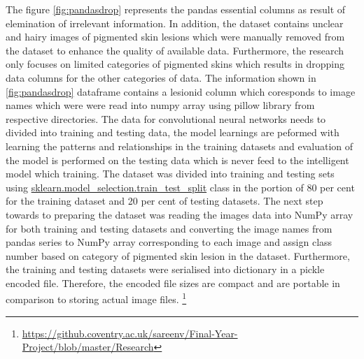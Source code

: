 The figure \ref{fig:pandasdrop} represents the pandas essential columns as result of elemination of irrelevant information.
In addition, the dataset contains unclear and hairy images of pigmented skin lesions which were manually 
removed from the dataset to enhance the quality of available data.
Furthermore, the research only focuses on limited categories of 
pigmented skins which results in dropping data columns for the other categories 
of data. The information shown in \ref{fig:pandasdrop} dataframe contains a lesionid column which coresponds
to image names which were were read into numpy array using pillow library from respective directories.
The data for convolutional neural networks needs to divided into training and testing data, the model learnings
are peformed with learning the patterns and relationships in the training datasets and evaluation of the 
model is performed on the testing data which is never feed to the intelligent model which training.
The dataset was divided into training and testing sets using \url{sklearn.model_selection.train_test_split} class in the portion of 80 per cent for 
the training dataset and 20 per cent of testing datasets. The next step towards to preparing the dataset was reading the images data into NumPy 
array for both training and testing datasets and converting the image names from pandas series to NumPy array corresponding to each image and assign class number 
based on category of pigmented skin lesion in the dataset. Furthermore, the training and testing datasets were serialised into 
dictionary in a pickle encoded file. Therefore, the encoded file sizes are compact and are portable
in comparison to storing actual image files. \footnote{\url{https://github.coventry.ac.uk/sareenv/Final-Year-Project/blob/master/Research}}
\pagebreak